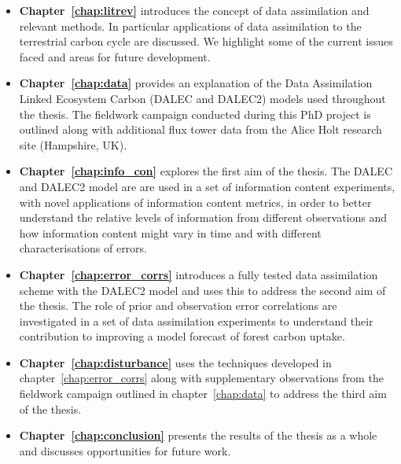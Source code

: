 \begin{itemize}
\item \textbf{Chapter~\ref{chap:litrev}} introduces the concept of data assimilation and relevant methods. In particular applications of data assimilation to the terrestrial carbon cycle are discussed. We highlight some of the current issues faced and areas for future development.  

\item \textbf{Chapter~\ref{chap:data}} provides an explanation of the Data Assimilation Linked Ecosystem Carbon (DALEC and DALEC2) models used throughout the thesis. The fieldwork campaign conducted during this PhD project is outlined along with additional flux tower data from the Alice Holt research site (Hampshire, UK).

\item \textbf{Chapter~\ref{chap:info_con}} explores the first aim of the thesis. The DALEC and DALEC2 model are are used in a set of information content experiments, with novel applications of information content metrics, in order to better understand the relative levels of information from different observations and how information content might vary in time and with different characterisations of errors.

\item \textbf{Chapter~\ref{chap:error_corrs}} introduces a fully tested data assimilation scheme with the DALEC2 model and uses this to address the second aim of the thesis. The role of prior and observation error correlations are investigated in a set of data assimilation experiments to understand their contribution to improving a model forecast of forest carbon uptake.

\item \textbf{Chapter~\ref{chap:disturbance}} uses the techniques developed in chapter~\ref{chap:error_corrs} along with supplementary observations from the fieldwork campaign outlined in chapter~\ref{chap:data} to address the third aim of the thesis.

\item \textbf{Chapter~\ref{chap:conclusion}} presents the results of the thesis as a whole and discusses opportunities for future work.    

\end{itemize}
     


